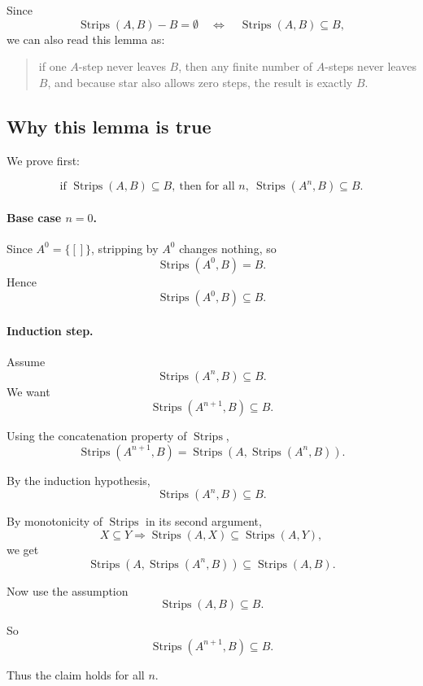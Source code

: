 \documentclass[11pt]{article}
\begin{document}
Since
\[
\operatorname{Strips}(A,B)-B=\emptyset
\quad\Longleftrightarrow\quad
\operatorname{Strips}(A,B)\subseteq B,
\]
we can also read this lemma as:

\begin{quote}
if one \(A\)-step never leaves \(B\), then any finite number of \(A\)-steps never leaves \(B\), and because star also allows zero steps, the result is exactly \(B\).
\end{quote}

\subsection*{Why this lemma is true}

We prove first:

\[
\text{if } \operatorname{Strips}(A,B)\subseteq B,\ \text{then for all }n,\ \operatorname{Strips}(A^n,B)\subseteq B.
\]

\paragraph{Base case \(n=0\).}
Since \(A^0=\{[]\}\), stripping by \(A^0\) changes nothing, so
\[
\operatorname{Strips}(A^0,B)=B.
\]
Hence
\[
\operatorname{Strips}(A^0,B)\subseteq B.
\]

\paragraph{Induction step.}
Assume
\[
\operatorname{Strips}(A^n,B)\subseteq B.
\]
We want
\[
\operatorname{Strips}(A^{n+1},B)\subseteq B.
\]

Using the concatenation property of \(\operatorname{Strips}\),
\[
\operatorname{Strips}(A^{n+1},B)
=
\operatorname{Strips}(A,\operatorname{Strips}(A^n,B)).
\]

By the induction hypothesis,
\[
\operatorname{Strips}(A^n,B)\subseteq B.
\]

By monotonicity of \(\operatorname{Strips}\) in its second argument,
\[
X\subseteq Y \Longrightarrow \operatorname{Strips}(A,X)\subseteq \operatorname{Strips}(A,Y),
\]
we get
\[
\operatorname{Strips}(A,\operatorname{Strips}(A^n,B))
\subseteq
\operatorname{Strips}(A,B).
\]

Now use the assumption
\[
\operatorname{Strips}(A,B)\subseteq B.
\]

So
\[
\operatorname{Strips}(A^{n+1},B)\subseteq B.
\]

Thus the claim holds for all \(n\).
\end{document}
